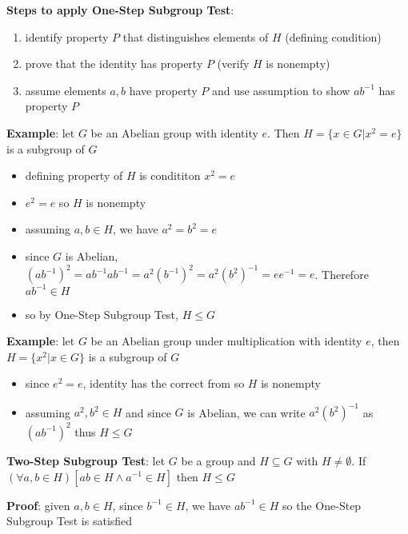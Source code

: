 \documentclass{article}
\begin{document}
  \textbf{Steps to apply One-Step Subgroup Test}:
  \begin{enumerate}
    \item identify property $P$ that distinguishes elements of $H$ (defining condition)
    \item prove that the identity has property $P$ (verify $H$ is nonempty)
    \item assume elements $a, b$ have property $P$ and use assumption to show $ab^{-1}$ has property $P$
  \end{enumerate}

  \textbf{Example}: let $G$ be an Abelian group with identity $e$. Then $H = \{x \in G | x^2 = e\}$ is a subgroup of $G$
  \begin{itemize}
    \item defining property of $H$ is condititon $x^2 = e$
    \item $e^2 = e$ so $H$ is nonempty
    \item assuming $a, b \in H$, we have $a^2 = b^2 = e$
    \item since $G$ is Abelian, $(ab^{-1})^2 = ab^{-1}ab^{-1} = a^2(b^{-1})^2 = a^2(b^2)^{-1} = ee^{-1} = e$. Therefore $ab^{-1} \in H$
    \item so by One-Step Subgroup Test, $H \leq G$
  \end{itemize}

  \textbf{Example}: let $G$ be an Abelian group under multiplication with identity $e$, then $H = \{x^2 | x \in G\}$ is a subgroup of $G$
  \begin{itemize}
    \item since $e^2 = e$, identity has the correct from so $H$ is nonempty
    \item assuming $a^2, b^2 \in H$ and since $G$ is Abelian, we can write $a^2(b^2)^{-1}$ as $(ab^{-1})^2$ thus $H \leq G$
  \end{itemize}
  \bigskip

  \textbf{Two-Step Subgroup Test}: let $G$ be a group and $H \subseteq G$ with $H \neq \emptyset$. If $(\forall a, b \in H) [ab \in H \wedge a^{-1} \in H]$ then $H \leq G$

  \textbf{Proof}: given $a, b \in H$, since $b^{-1} \in H$, we have $ab^{-1} \in H$ so the One-Step Subgroup Test is satisfied
\end{document}
